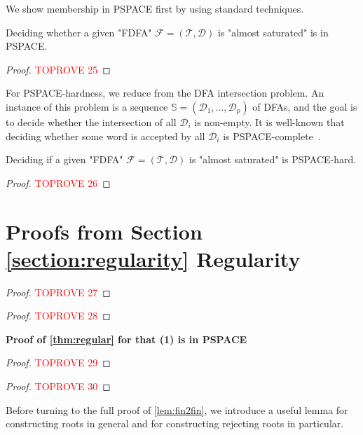 \documentclass[a4paper,USenglish,cleveref,autoref,thm-restate]{lipics-v2021}
\newcommand{\mc}[1]{\ensuremath{\mathcal{#1}}}
\newcommand{\T}{\mc{T}}
\newcommand{\F}{\mc{F}}
\newcommand{\D}{\mc{D}}
\newcommand{\PSPACE}{\textsf{PSPACE}\xspace}
\begin{document}
{\almostsaturationPSPACEcomplete*

We show membership in \PSPACE first by using standard techniques.

\begin{lemma}
  Deciding whether a given "FDFA" $\F = (\T, \D)$ is "almost saturated" is in \PSPACE.\label{lemma:powerclosednessPSPACEmembership}
\end{lemma}
\begin{proof}\textcolor{red}{TOPROVE 25}\end{proof}

For \PSPACE-hardness, we reduce from the DFA intersection problem.
An instance of this problem is a sequence $\mathbb{S} = (\D_1, \dots,\D_p)$ of DFAs, and the goal is to decide whether the intersection of all $\D_i$ is non-empty.
It is well-known that deciding whether some word is accepted by all $\D_i$ is \PSPACE-complete~\cite{Kozen77}.

\begin{lemma}
    Deciding if a given "FDFA" $\F = (\T, \D)$ is "almost saturated" is \PSPACE-hard.
    \label{lemma:powerclosednessPSPACEhard}
\end{lemma}
\begin{proof}\textcolor{red}{TOPROVE 26}\end{proof}
 \section{Proofs from Section \ref{section:regularity} Regularity}
\label{section:appregularity}

\rstFDWAregular*
\begin{proof}\textcolor{red}{TOPROVE 27}\end{proof}

\rststabilize*
\begin{proof}\textcolor{red}{TOPROVE 28}\end{proof}

\textbf{Proof of \cref{thm:regular} for that (1) is in \PSPACE}

\begin{proof}\textcolor{red}{TOPROVE 29}\end{proof}

\rstregularEquivalent*
\begin{proof}\textcolor{red}{TOPROVE 30}\end{proof}


\rstfinfin*

Before turning to the full proof of \cref{lem:fin2fin}, we introduce a useful lemma for constructing roots in general and for constructing rejecting roots in particular.

}
\end{document}
